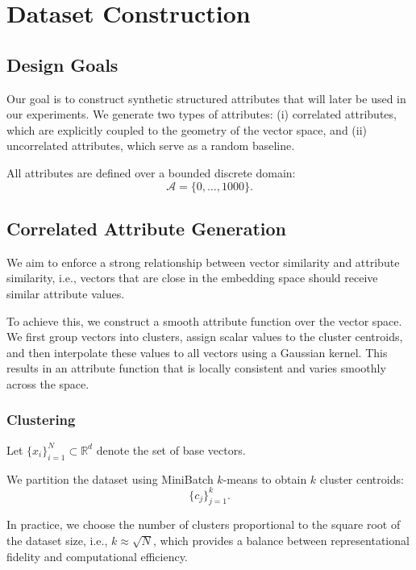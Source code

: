 \chapter{Dataset Construction}\label{chap:dataset-construction}

\section{Design Goals}

Our goal is to construct synthetic structured attributes that will later be used in our experiments. We generate two types of attributes: (i) correlated attributes, which are explicitly coupled to the geometry of the vector space, and (ii) uncorrelated attributes, which serve as a random baseline.

All attributes are defined over a bounded discrete domain:
\[
\mathcal{A} = \{0, \dots, 1000\}.
\]

\section{Correlated Attribute Generation}\label{sec:correlated-attribute-generation}

We aim to enforce a strong relationship between vector similarity and attribute similarity, i.e., vectors that are close in the embedding space should receive similar attribute values.

To achieve this, we construct a smooth attribute function over the vector space. We first group vectors into clusters, assign scalar values to the cluster centroids, and then interpolate these values to all vectors using a Gaussian kernel. This results in an attribute function that is locally consistent and varies smoothly across the space.

\subsection{Clustering}

Let $\{x_i\}_{i=1}^N \subset \mathbb{R}^d$ denote the set of base vectors.

We partition the dataset using MiniBatch $k$-means to obtain $k$ cluster centroids:
\[
\{c_j\}_{j=1}^k.
\]

In practice, we choose the number of clusters proportional to the square root of the dataset size, i.e., $k \approx \sqrt{N}$, which provides a balance between representational fidelity and computational efficiency.

